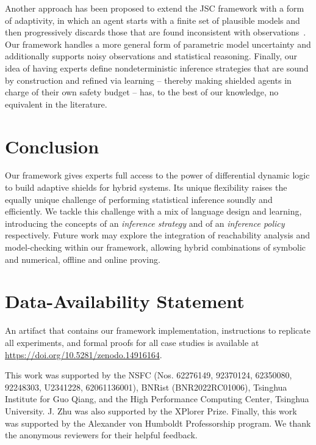\documentclass[acmsmall,screen,nonacm]{acmart}
\begin{document}
Another approach has been proposed to extend the JSC framework with a form of adaptivity, in which an agent starts with a finite set of plausible models and then progressively discards those that are found inconsistent with observations~\cite{DBLP:conf/tacas/FultonP19}. Our framework handles a more general form of parametric model uncertainty and additionally supports noisy observations and statistical reasoning. Finally, our idea of having experts define nondeterministic inference strategies that are sound by construction and refined via learning -- thereby making shielded agents in charge of their own safety budget -- has, to the best of our knowledge, no equivalent in the literature.

\section{Conclusion}

Our framework gives experts full access to the power of differential dynamic logic to build adaptive shields for hybrid systems. Its unique flexibility raises the equally unique challenge of performing statistical inference soundly and efficiently. We tackle this challenge with a mix of language design and learning, introducing the concepts of an \emph{inference strategy} and of an \emph{inference policy} respectively. Future work may explore the integration of reachability analysis and model-checking within our framework, allowing hybrid combinations of symbolic and numerical, offline and online proving.






\section*{Data-Availability Statement}
An artifact that contains our framework implementation, instructions to replicate all experiments, and formal proofs for all case studies is available at \url{https://doi.org/10.5281/zenodo.14916164}.

\begin{acks}
  This work was supported by the NSFC (Nos. 62276149, 92370124, 62350080, 92248303, U2341228, 62061136001), BNRist (BNR2022RC01006), Tsinghua Institute for Guo Qiang, and the High Performance Computing Center, Tsinghua University. J. Zhu was also supported by the XPlorer Prize. Finally, this work was supported by the Alexander von Humboldt Professorship program. We thank the anonymous reviewers for their helpful feedback.
\end{acks}
\end{document}
